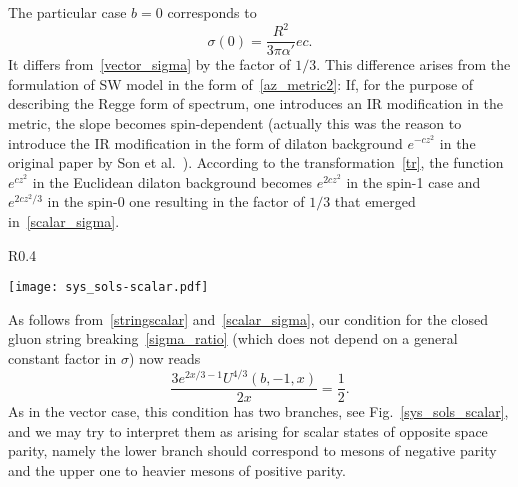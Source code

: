 \documentclass[a4paper,11pt]{article}
\begin{document}
The particular case $b=0$ corresponds to
\begin{equation}
\label{scalar_sigma}
  \sigma(0)=\frac{R^2}{3\pi\alpha'}ec.
\end{equation}
It differs from~\eqref{vector_sigma} by the factor of $1/3$. This difference arises from the
formulation of SW model in the form of~\eqref{az_metric2}: If, for the purpose of describing
the Regge form of spectrum, one introduces an IR modification in the metric, the slope becomes
spin-dependent (actually this was the reason to introduce the IR modification in the form of
dilaton background $e^{-cz^2}$ in the original paper by Son et al.~\cite{son2}). According to
the transformation~\eqref{tr}, the function $e^{cz^2}$ in the Euclidean dilaton background
becomes $e^{2cz^2}$ in the spin-1 case and $e^{2cz^2/3}$ in the spin-0 one resulting in the
factor of $1/3$ that emerged in~\eqref{scalar_sigma}.

\begin{wrapfigure}{R}{0.4\textwidth}
  \vspace{-7mm}
  \begin{center}
    \texttt{[image: sys\_sols-scalar.pdf]}
  \end{center}
  \vspace*{-7mm}
  \caption{\footnotesize The string breaking (blue solid) and reality (orange
  dashed) conditions in the scalar case.}
  \vspace*{2mm}
  \label{sys_sols_scalar}
\end{wrapfigure}

As follows from~\eqref{stringscalar} and~\eqref{scalar_sigma}, our condition for the closed gluon
string breaking~\eqref{sigma_ratio} (which does not depend on a
general constant factor in $\sigma$) now reads
\begin{equation}
\label{scalar_breaking}
      \dfrac{3e^{2x/3-1}U^{4/3}(b,-1,x)}{2x}=\dfrac{1}{2}.
\end{equation}
As in the vector case, this condition has two branches, see Fig.~\ref{sys_sols_scalar},
and we may try to interpret them as arising for scalar states of opposite
space parity, namely the lower branch should correspond to mesons
of negative parity and the upper one to heavier mesons of positive parity.
\end{document}
